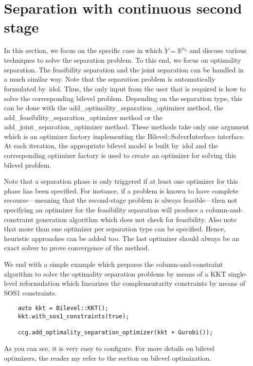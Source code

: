 \section{Separation with continuous second stage}

In this section, we focus on the specific case in which $\tilde{Y} =
\mathbb{R}^{n_y}$ and discuss various techniques to solve the separation
problem. To this end, we focus on optimality separation. The feasibility
separation and the joint separation can be handled in a much similar way. Note
that the separation problem is automatically formulated by~\textsf{idol}.
Thus, the only input from the user that is required is how to solve the
corresponding bilevel problem. Depending on the separation type, this can be
done with the \textsf{add\_optimality\_separation\_optimizer} method, the
\textsf{add\_feasibility\_separation\_optimizer} method or the
\textsf{add\_joint\_separation\_optimizer} method. These methods take only one
argument which is an optimizer factory implementing the
\textsf{Bilevel::SolverInterface} interface. At each iteration, the
appropriate bilevel model is built by~\textsf{idol} and the corresponding
optimizer factory is used to create an optimizer for solving this bilevel
problem.

Note that a separation phase is only triggered if at least one optimizer for
this phase has been specified. For instance, if a problem is known to have
complete recourse---meaning that the second-stage problem is always
feasible---then not specifying an optimizer for the feasibility separation
will produce a column-and-constraint generation algorithm which does not check
for feasibility. Also note that more than one optimizer per separation type
can be specified. Hence, heuristic approaches can be added too. The last
optimizer should always be an exact solver to prove convergence of the method.

We end with a simple example which prepares the column-and-constraint
algorithm to solve the optimality separation problems by means of a KKT
single-level reformulation which linearizes the complementarity constraints by
means of SOS1 constraints.
%
\begin{lstlisting}
    auto kkt = Bilevel::KKT();
    kkt.with_sos1_constraints(true);

    ccg.add_optimality_separation_optimizer(kkt + Gurobi());
\end{lstlisting}
As you can see, it is very easy to configure. For more details on bilevel
optimizers, the reader my refer to the section on bilevel optimization.


